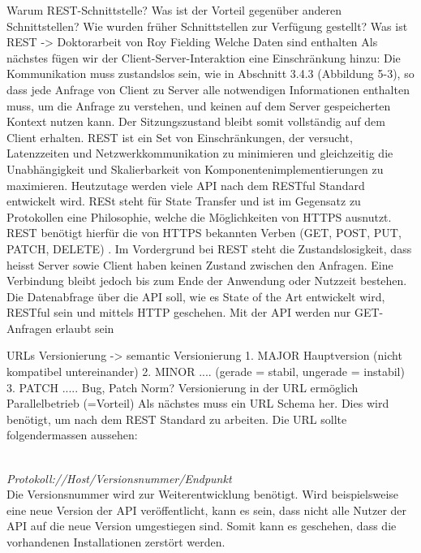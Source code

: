 Warum REST-Schnittstelle? Was ist der Vorteil gegenüber anderen Schnittstellen? Wie wurden früher Schnittstellen zur Verfügung gestellt?
Was ist REST -> Doktorarbeit von Roy Fielding
Welche Daten sind enthalten
Als nächstes fügen wir der Client-Server-Interaktion eine Einschränkung hinzu: Die Kommunikation muss zustandslos sein, wie in Abschnitt 3.4.3 (Abbildung 5-3), so dass jede Anfrage von Client zu Server alle notwendigen Informationen enthalten muss, um die Anfrage zu verstehen, und keinen auf dem Server gespeicherten Kontext nutzen kann. Der Sitzungszustand bleibt somit vollständig auf dem Client erhalten.
REST ist ein Set von Einschränkungen, der versucht, Latenzzeiten und Netzwerkkommunikation zu minimieren und gleichzeitig die Unabhängigkeit und Skalierbarkeit von Komponentenimplementierungen zu maximieren.
Heutzutage werden viele API nach dem RESTful Standard entwickelt wird. RESt steht für State Transfer und ist im Gegensatz zu Protokollen eine Philosophie, welche die Möglichkeiten von HTTPS ausnutzt. REST benötigt hierfür die von HTTPS bekannten Verben (GET, POST, PUT, PATCH, DELETE) \cite{LornaJaneMitchell2013oreilly}. Im Vordergrund bei REST steht die Zustandslosigkeit, dass heisst Server sowie Client haben keinen Zustand zwischen den Anfragen. Eine Verbindung bleibt jedoch bis zum Ende der Anwendung oder Nutzzeit bestehen.
Die Datenabfrage über die API soll, wie es State of the Art entwickelt wird, RESTful sein und mittels HTTP geschehen. Mit der API werden nur GET-Anfragen erlaubt sein

\noindent
{}\newline

URLs
Versionierung -> semantic Versionierung
1. MAJOR Hauptversion (nicht kompatibel untereinander)
2. MINOR .... (gerade = stabil, ungerade = instabil)
3. PATCH ..... Bug, Patch
Norm?
Versionierung in der URL ermöglich Parallelbetrieb (=Vorteil)
Als nächstes muss ein URL Schema her. Dies wird benötigt, um nach dem REST Standard zu arbeiten. Die URL sollte folgendermassen aussehen:


\\\emph{Protokoll://Host/Versionsnummer/Endpunkt} \\

Die Versionsnummer wird zur Weiterentwicklung benötigt. Wird beispielsweise eine neue Version der API veröffentlicht, kann es sein, dass nicht alle Nutzer der API auf die neue Version umgestiegen sind. Somit kann es geschehen, dass die vorhandenen Installationen zerstört werden.








